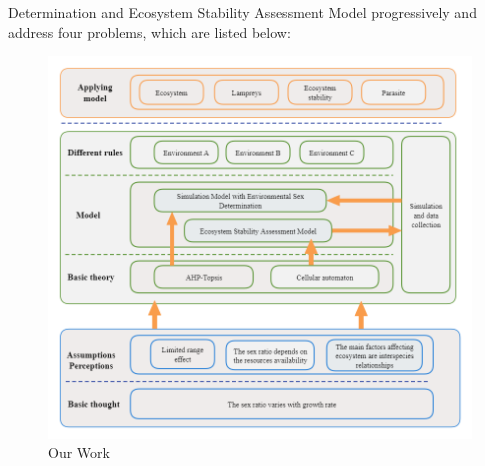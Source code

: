 \documentclass{mcmthesis}
\begin{document}
Determination and Ecosystem Stability Assessment Model progressively and address four problems, which are listed below:
\begin{figure}[H]  %
\small
\centering  %
\includegraphics[width=15cm]{figures/architectural.png}  %
\caption{Our Work} \label{fig:Our Work}  %
\end{figure}  %
\end{document}
